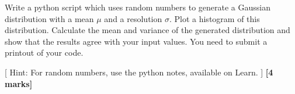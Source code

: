 \begin{enumerate}
Write a python script which uses random numbers to generate a Gaussian distribution with a mean $\mu$ and a resolution $\sigma$.
Plot a histogram of  this distribution.
Calculate the mean and variance  of the generated distribution and show 
that the results agree with your input values.
You need to submit a printout of your code.

[ Hint: For random numbers, use the python notes, available on Learn. ]
\hfill {\bf [4 marks]}

\end{enumerate}